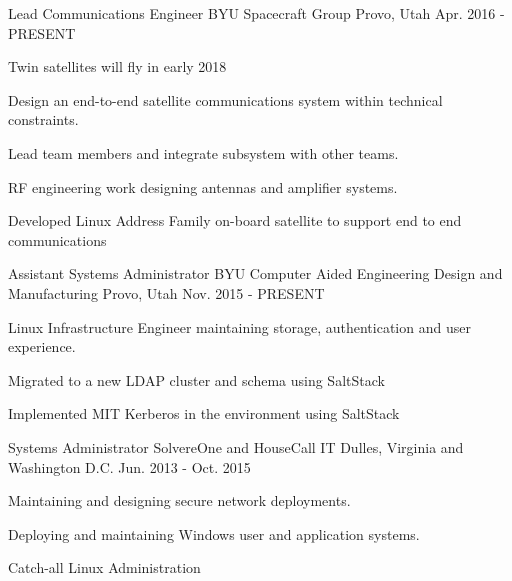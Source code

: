 

\begin{cventries}

    \cventry
    {Lead Communications Engineer} %
    {BYU Spacecraft Group} %
    {Provo, Utah} %
    {Apr. 2016 - PRESENT} %
    {
        \begin{cvitems} %
        \item {Twin satellites will fly in early 2018}
        \item {Design an end-to-end satellite communications system within technical constraints.}
        \item {Lead team members and integrate subsystem with other teams.}
        \item {RF engineering work designing antennas and amplifier systems.}
        \item {Developed Linux Address Family on-board satellite to support end to end communications}
        \end{cvitems}
    }

    \cventry
    {Assistant Systems Administrator} %
    {BYU Computer Aided Engineering Design and Manufacturing} %
    {Provo, Utah} %
    {Nov. 2015 - PRESENT} %
    {
        \begin{cvitems} %
        \item {Linux Infrastructure Engineer maintaining storage, authentication and user experience.}
        \item {Migrated to a new LDAP cluster and schema using SaltStack}
        \item {Implemented MIT Kerberos in the environment using SaltStack}
        \end{cvitems}
    }

    \cventry
    {Systems Administrator} %
    {SolvereOne and HouseCall IT} %
    {Dulles, Virginia and Washington D.C.} %
    {Jun. 2013 - Oct. 2015} %
    {
        \begin{cvitems} %
        \item {Maintaining and designing secure network deployments.}
        \item {Deploying and maintaining Windows user and application systems.}
        \item {Catch-all Linux Administration}
        \end{cvitems}
    }

\end{cventries}
